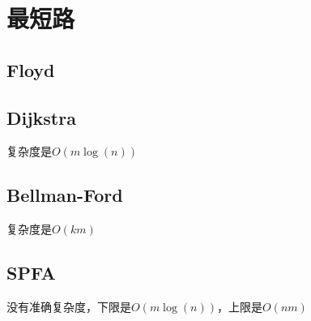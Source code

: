 \section{最短路}
\subsection{Floyd}

\subsection{Dijkstra}
复杂度是$O(m\log(n))$

\subsection{Bellman-Ford}
复杂度是$O(km)$


\subsection{SPFA}
没有准确复杂度，下限是$O(m\log(n))$，上限是$O(nm)$
